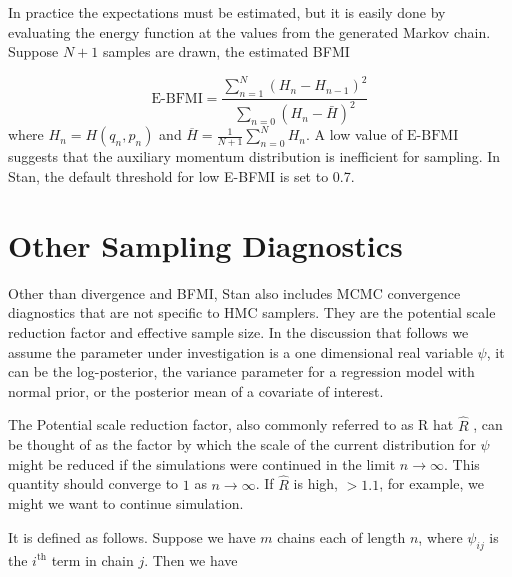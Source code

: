 \documentclass[12pt]{report}
\begin{document}
 In practice the expectations must be estimated, but
it is easily done by evaluating the energy function at the values from the
generated Markov chain. Suppose $N+1$ samples are drawn, the estimated BFMI 

\[ \text{E-BFMI} = \frac{\sum_{n=1}^N(H_n-H_{n-1})^2}{\sum_{n=0}(H_n-\bar{H})^2} \]
where $H_n = H(q_n,p_n)$ and $\overline{H}=\frac{1}{N+1}\sum_{n=0}^N H_n$. A low value of $\text{E-BFMI}$ suggests that the auxiliary momentum distribution is
inefficient for sampling. In Stan, the default threshold for low E-BFMI is set to 0.7.

 
\section{Other Sampling Diagnostics}

Other than divergence and BFMI, Stan also includes MCMC convergence diagnostics that are not specific to HMC samplers. They are the potential scale reduction factor and effective sample size. In the discussion that follows we assume the parameter under investigation is a one dimensional real variable $\psi$, it can be the log-posterior, the variance parameter for a regression model with normal prior, or the posterior mean of a covariate of interest.


The Potential scale reduction factor, also commonly referred to as R hat $\hat{R}$ , can be thought of as the factor by which the scale of the current distribution for $\psi$ might be reduced if the simulations were continued in the limit $n \rightarrow \infty$. This quantity should converge to $1$ as $n \rightarrow \infty$. If $\hat{R}$ is high, $ > 1.1 $, for example, we might we want to continue simulation. 

It is defined as follows. Suppose we have $m$ chains each of length $n$, where $\psi_{ij}$ is the $i^\text{th}$ term in chain $j$. Then we have 
\end{document}
